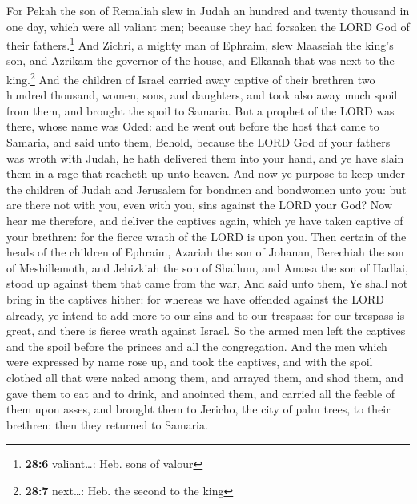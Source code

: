  For Pekah the son of Remaliah slew in Judah an hundred
and twenty thousand in one day, which were all valiant men; because they
had forsaken the LORD God of their fathers.\footnote{\textbf{28:6}
  valiant\ldots: Heb. sons of valour}  And Zichri, a
mighty man of Ephraim, slew Maaseiah the king's son, and Azrikam the
governor of the house, and Elkanah that was next to the king.\footnote{\textbf{28:7}
  next\ldots: Heb. the second to the king}  And the
children of Israel carried away captive of their brethren two hundred
thousand, women, sons, and daughters, and took also away much spoil from
them, and brought the spoil to Samaria.  But a prophet of
the LORD was there, whose name was Oded: and he went out before the host
that came to Samaria, and said unto them, Behold, because the LORD God
of your fathers was wroth with Judah, he hath delivered them into your
hand, and ye have slain them in a rage that reacheth up unto heaven.
 And now ye purpose to keep under the children of Judah
and Jerusalem for bondmen and bondwomen unto you: but are there not with
you, even with you, sins against the LORD your God?  Now
hear me therefore, and deliver the captives again, which ye have taken
captive of your brethren: for the fierce wrath of the LORD is upon you.
 Then certain of the heads of the children of Ephraim,
Azariah the son of Johanan, Berechiah the son of Meshillemoth, and
Jehizkiah the son of Shallum, and Amasa the son of Hadlai, stood up
against them that came from the war,  And said unto them,
Ye shall not bring in the captives hither: for whereas we have offended
against the LORD already, ye intend to add more to our sins and to our
trespass: for our trespass is great, and there is fierce wrath against
Israel.  So the armed men left the captives and the spoil
before the princes and all the congregation.  And the men
which were expressed by name rose up, and took the captives, and with
the spoil clothed all that were naked among them, and arrayed them, and
shod them, and gave them to eat and to drink, and anointed them, and
carried all the feeble of them upon asses, and brought them to Jericho,
the city of palm trees, to their brethren: then they returned to
Samaria.

